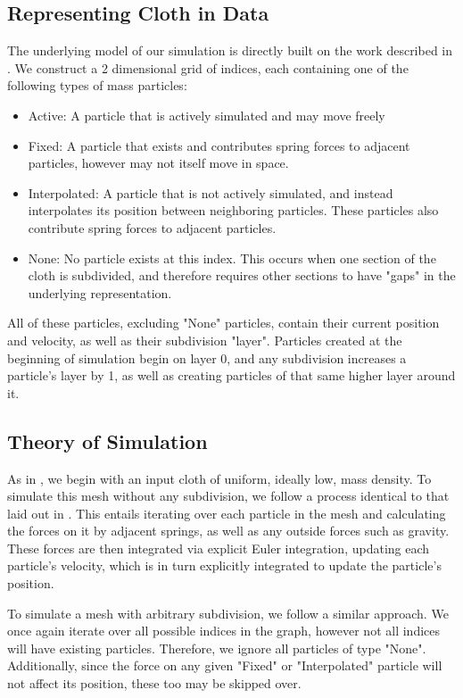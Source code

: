 \documentclass[sigconf]{acmart}
\begin{document}
\subsection{Representing Cloth in Data}
The underlying model of our simulation is directly built on the work described in \cite{hutchinson}. We construct a 2 dimensional grid of indices, each containing one of the following types of mass particles:
\begin{itemize}
\item Active: A particle that is actively simulated and may move freely
\item Fixed: A particle that exists and contributes spring forces to adjacent particles, however may not itself move in space.
\item Interpolated: A particle that is not actively simulated, and instead interpolates its position between neighboring particles. These particles also contribute spring forces to adjacent particles.
\item None: No particle exists at this index. This occurs when one section of the cloth is subdivided, and therefore requires other sections to have "gaps" in the underlying representation.
\end{itemize} 
All of these particles, excluding "None" particles, contain their current position and velocity, as well as their subdivision "layer". Particles created at the beginning of simulation begin on layer 0, and any subdivision increases a particle's layer by 1, as well as creating particles of that same higher layer around it.
\subsection{Theory of Simulation}
As in \cite{hutchinson}, we begin with an input cloth of uniform, ideally low, mass density. To simulate this mesh without any subdivision, we follow a process identical to that laid out in \cite{provot}. This entails iterating over each particle in the mesh and calculating the forces on it by adjacent springs, as well as any outside forces such as gravity. These forces are then integrated via explicit Euler integration, updating each particle's velocity, which is in turn explicitly integrated to update the particle's position. 

To simulate a mesh with arbitrary subdivision, we follow a similar approach. We once again iterate over all possible indices in the graph, however not all indices will have existing particles. Therefore, we ignore all particles of type "None". Additionally, since the force on any given "Fixed" or "Interpolated" particle will not affect its position, these too may be skipped over. 
\end{document}
